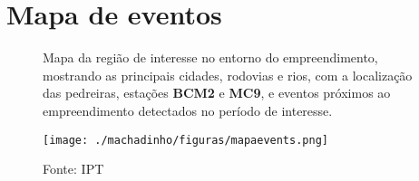 
    \newpage
    \section{Mapa de eventos}
    \begin{figure}[ht!]
    \centering
    \captionsetup{justification=justified, singlelinecheck=false, width=1\textwidth}
    \caption{Mapa da região de interesse no entorno do empreendimento, mostrando as principais cidades, rodovias e rios, com a localização das pedreiras, estações \textbf{BCM2} e \textbf{MC9}, e eventos próximos ao empreendimento detectados no período de interesse.}
    \begin{mdframed}[
        linecolor=black,
        linewidth=1pt,
        roundcorner=10pt,
    ]
    \begin{center}
    \texttt{[image: ./machadinho/figuras/mapaevents.png]}
    \end{center}
    \end{mdframed}
    \caption*{Fonte: IPT}
    \end{figure}
    \newpage
    
